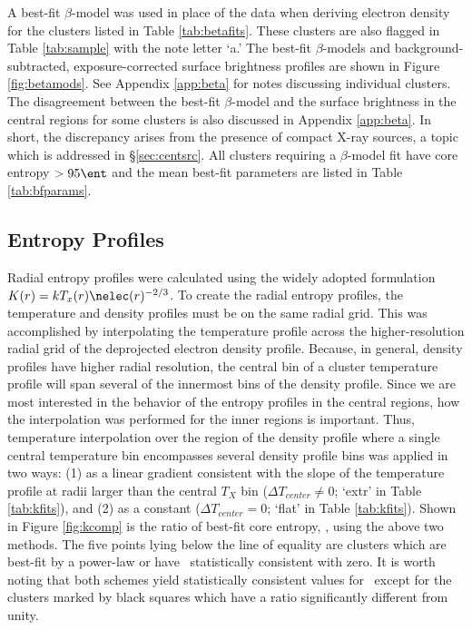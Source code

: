 \documentclass{emulateapj}
\begin{document}
A best-fit $\beta$-model was used in place of the data when deriving
electron density for the clusters listed in Table
\ref{tab:betafits}. These clusters are also flagged in Table
\ref{tab:sample} with the note letter `a.' The best-fit $\beta$-models
and background-subtracted, exposure-corrected surface brightness
profiles are shown in Figure \ref{fig:betamods}. See Appendix
\ref{app:beta} for notes discussing individual clusters. The
disagreement between the best-fit $\beta$-model and the surface
brightness in the central regions for some clusters is also discussed
in Appendix \ref{app:beta}. In short, the discrepancy arises from the
presence of compact X-ray sources, a topic which is addressed in
\S\ref{sec:centsrc}. All clusters requiring a $\beta$-model fit have
core entropy $> 95 \ent$ and the mean best-fit parameters are listed
in Table \ref{tab:bfparams}.

\subsection{Entropy Profiles}
\label{sec:kpr}

Radial entropy profiles were calculated using the widely adopted
formulation $K(r) = kT_x(r)\nelec(r)^{-2/3}$. To create the radial
entropy profiles, the temperature and density profiles must be on the
same radial grid. This was accomplished by interpolating the
temperature profile across the higher-resolution radial grid of the
deprojected electron density profile. Because, in general, density
profiles have higher radial resolution, the central bin of a cluster
temperature profile will span several of the innermost bins of the
density profile. Since we are most interested in the behavior of the
entropy profiles in the central regions, how the interpolation was
performed for the inner regions is important. Thus, temperature
interpolation over the region of the density profile where a single
central temperature bin encompasses several density profile bins was
applied in two ways: (1) as a linear gradient consistent with the
slope of the temperature profile at radii larger than the central
$T_X$ bin ($\Delta T_{center} \ne 0$; `extr' in Table
\ref{tab:kfits}), and (2) as a constant ($\Delta T_{center}=0$; `flat'
in Table \ref{tab:kfits}). Shown in Figure \ref{fig:kcomp} is the
ratio of best-fit core entropy, \kna, using the above two methods. The
five points lying below the line of equality are clusters which are
best-fit by a power-law or have \kna\ statistically consistent with
zero. It is worth noting that both schemes yield statistically
consistent values for \kna\ except for the clusters marked by black
squares which have a ratio significantly different from unity.
\end{document}
